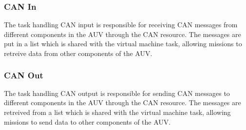 \subsubsection{CAN In}
The task handling CAN input is responsible for receiving CAN messages from different components in the AUV through the CAN resource. The messages are put in a list which is shared with the virtual machine task, allowing missions to retreive data from other components of the AUV.

\subsubsection{CAN Out}
The task handling CAN output is responsible for sending CAN messages to different components in the AUV through the CAN resource. The messages are retreived from a list which is shared with the virtual machine task, allowing missions to send data to other components of the AUV.
